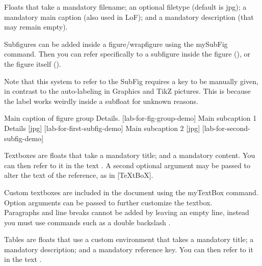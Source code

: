 \lipsum[1]


Floats that take a mandatory filename; an optional filetype (default is jpg); a mandatory main caption (also used in LoF); and a mandatory description (that may remain empty).

Subfigures can be added inside a figure/wrapfigure using the mySubFig command. Then you can refer specifically to a subfigure inside the figure (), or the figure itself ().

Note that this system to refer to the SubFig requires a key to be manually given, in contrast to the auto-labeling in Graphics and TikZ pictures.
This is because the label works weirdly inside a subfloat for unknown reasons.


\begin{myFigEnv}[][width=1\linewidth]
  {Main caption of figure group} %
  {Details.}%
  [lab-for-fig-group-demo]
  \mySubfig
  {Main subcaption 1}%
  {Details}%
  {%
    [jpg]%
  }%
  [lab-for-first-subfig-demo]
  \hfill
  \mySubfig
  {Main subcaption 2}%
  {}%
  {%
    [jpg]%
  }%
  [lab-for-second-subfig-demo]
\end{myFigEnv}


Textboxes are floats that take a mandatory title; and a mandatory content.
You can then refer to it in the text . A second optional argument may be passed to alter the text of the reference, as in [TeXtBoX].

{
Custom textboxes are included in the document using the myTextBox command. Option arguments can be passed to further customize the textbox.
\\%
Paragraphs and line breaks cannot be added by leaving an empty line, instead you must use commands such as a double backslash \detokenize{\\}.
}

Tables are floats that use a custom environment that takes a mandatory title; a mandatory description; and a mandatory reference key.
You can then refer to it in the text .


